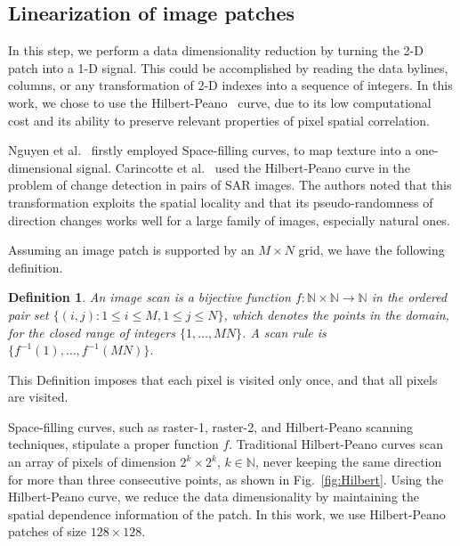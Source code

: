 \documentclass[journal]{IEEEtran}
\begin{document}
\subsection{Linearization of image patches}\label{linearization}

In this step, we perform a data dimensionality reduction by turning the 2-D patch into a 1-D signal.
This could be accomplished by reading the data bylines, columns, or any transformation of 2-D indexes into a sequence of integers.
In this work, we chose to use the Hilbert-Peano~\cite{Lee1994Texture} curve, due to its low computational cost and its ability to preserve relevant properties of pixel spatial correlation.

Nguyen et al.~\cite{nguyen1982space} firstly employed Space-filling curves, to map texture into a one-dimensional signal.
Carincotte et al.~\cite{Carincotte2006changeDetection} used the Hilbert-Peano curve in the problem of change detection in pairs of SAR images.
The authors noted that this transformation exploits the spatial locality and that its pseudo-randomness
of direction changes works well for a large family of images, especially
natural ones.

Assuming an image patch is supported by an $M \times N$ grid, we have the following definition.

\newtheorem{mydef}{Definition}
\begin{mydef}
	An image scan is a bijective function $f \colon \mathbb{N} \times \mathbb{N} \to \mathbb{N}$ in the ordered pair set $ \{(i, j): 1 \leq i \leq M , 1 \leq j \leq N\}$, which denotes the points in the domain, for the closed range of integers $\{1, \dots, M  N\}$.
	A scan rule is $\{f^{-1}(1), \dots, f^{-1}(M  N)\}$.
	\label{def:CurveFilling}
\end{mydef}
This Definition imposes that each pixel is visited only once, and that all pixels are visited.

Space-filling curves, such as raster-1, raster-2, and Hilbert-Peano scanning techniques, stipulate a proper function $f$.
Traditional Hilbert-Peano curves scan an array of pixels of dimension $2^k \times 2^k$, $k \in \mathbb{N}$, never keeping the same direction for more than three consecutive points, as shown in Fig.~\ref{fig:Hilbert}.
Using the Hilbert-Peano curve, we reduce the data dimensionality by maintaining the spatial dependence information of the patch.
In this work, we use Hilbert-Peano patches of size $128 \times 128$.
\end{document}
